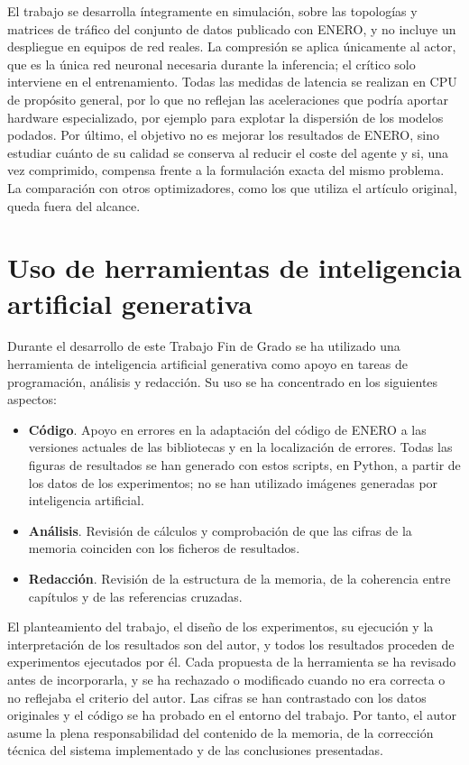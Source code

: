 El trabajo se desarrolla íntegramente en simulación, sobre las topologías y matrices de tráfico del conjunto de datos publicado con ENERO, y no incluye un despliegue en equipos de red reales. La compresión se aplica únicamente al actor, que es la única red neuronal necesaria durante la inferencia; el crítico solo interviene en el entrenamiento. Todas las medidas de latencia se realizan en CPU de propósito general, por lo que no reflejan las aceleraciones que podría aportar hardware especializado, por ejemplo para explotar la dispersión de los modelos podados. Por último, el objetivo no es mejorar los resultados de ENERO, sino estudiar cuánto de su calidad se conserva al reducir el coste del agente y si, una vez comprimido, compensa frente a la formulación exacta del mismo problema. La comparación con otros optimizadores, como los que utiliza el artículo original, queda fuera del alcance.

\section{Uso de herramientas de inteligencia artificial generativa}\label{sec:int_ia}

Durante el desarrollo de este Trabajo Fin de Grado se ha utilizado una herramienta de inteligencia artificial generativa como apoyo en tareas de programación, análisis y redacción. Su uso se ha concentrado en los siguientes aspectos:

\begin{itemize}
	\item \textbf{Código}. Apoyo en errores en la adaptación del código de ENERO a las versiones actuales de las bibliotecas y en la localización de errores. Todas las figuras de resultados se han generado con estos scripts, en Python, a partir de los datos de los experimentos; no se han utilizado imágenes generadas por inteligencia artificial.
	\item \textbf{Análisis}. Revisión de cálculos y comprobación de que las cifras de la memoria coinciden con los ficheros de resultados.
	\item \textbf{Redacción}. Revisión de la estructura de la memoria, de la coherencia entre capítulos y de las referencias cruzadas.
\end{itemize}

El planteamiento del trabajo, el diseño de los experimentos, su ejecución y la interpretación de los resultados son del autor, y todos los resultados proceden de experimentos ejecutados por él. Cada propuesta de la herramienta se ha revisado antes de incorporarla, y se ha rechazado o modificado cuando no era correcta o no reflejaba el criterio del autor. Las cifras se han contrastado con los datos originales y el código se ha probado en el entorno del trabajo. Por tanto, el autor asume la plena responsabilidad del contenido de la memoria, de la corrección técnica del sistema implementado y de las conclusiones presentadas.

